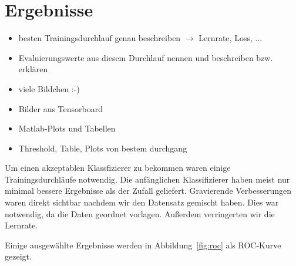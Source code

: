 \section{Ergebnisse}
\color{red}
\begin{itemize}
	\item besten Trainingsdurchlauf genau beschreiben $\rightarrow$ Lernrate, Loss, ...
	\item Evaluierungswerte aus diesem Durchlauf nennen und beschreiben bzw. erklären
	\item viele Bildchen :-) 
	\item Bilder aus Tensorboard
	\item Matlab-Plots und Tabellen 
    \item Threshold, Table, Plots von bestem durchgang
\end{itemize}
\color{black}

Um einen akzeptablen Klassfizierer zu bekommen waren einige Trainingsdurchläufe notwendig. Die anfänglichen Klassifizierer haben meist nur minimal bessere Ergebnisse als der Zufall geliefert. Gravierende Verbesserungen waren direkt sichtbar nachdem wir den Datensatz gemischt haben. Dies war notwendig, da die Daten geordnet vorlagen. Außerdem verringerten wir die Lernrate.

Einige ausgewählte Ergebnisse werden in Abbildung~\ref{fig:roc} als ROC-Kurve gezeigt.




